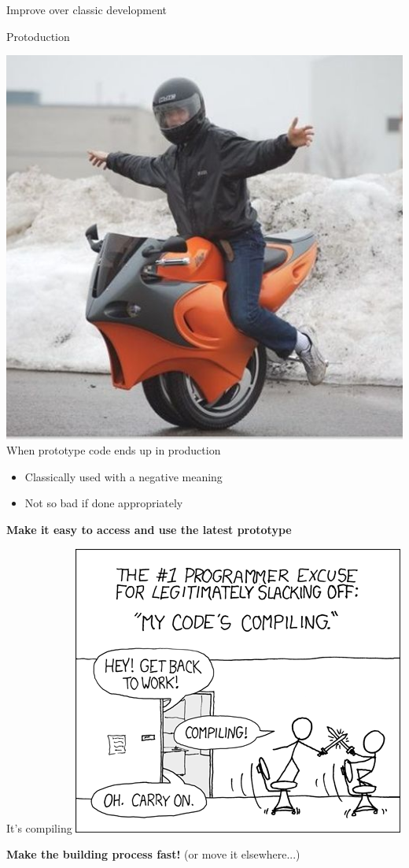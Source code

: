 \documentclass[presentation]{beamer}
\begin{document}
\begin{frame}{Improve over classic development}
	\begin{block}{Protoduction \cite{jargon}}
		\begin{center}
			\includegraphics[width=.25\textwidth]{images/protoduction} \\
			When prototype code ends up in production
		\end{center}
		\begin{itemize}
			\item Classically used with a negative meaning
			\item Not so bad if done appropriately
		\end{itemize}
		\textbf{Make it easy to access and use the latest prototype}
	\end{block}
	\begin{block}{It's compiling \cite{xkcd303}}
		\centering
		\includegraphics[width=.49\textwidth]{images/compiling}

		\textbf{Make the building process fast!} (or move it elsewhere...)
	\end{block}
\end{frame}
\end{document}

